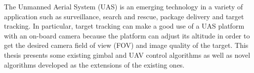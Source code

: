 \afterpage{\cleardoublepage}
The Unmanned Aerial System (UAS) is an emerging technology in a variety of application such as surveillance, search and rescue, package delivery and target tracking. In particular, target tracking can make a good use of a UAS platform with an on-board camera because the platform can adjust its altitude in order to get the desired camera field of view (FOV) and image quality of the target. This thesis presents some existing gimbal and UAV control algorithms as well as novel algorithms developed as the extensions of the existing ones. 